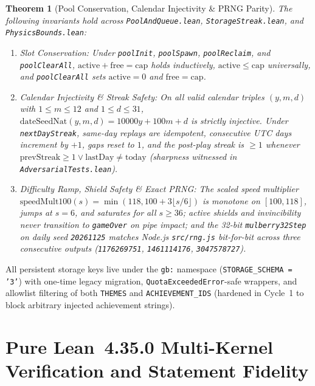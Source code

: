 \documentclass[11pt,letterpaper]{article}
\newtheorem{theorem}{Theorem}
\theoremstyle{remark}
\begin{document}
\begin{theorem}[Pool Conservation, Calendar Injectivity \& PRNG Parity]
\label{thm:pools}
The following invariants hold across \texttt{PoolAndQueue.lean}, \texttt{StorageStreak.lean}, and \texttt{PhysicsBounds.lean}:
\begin{enumerate}[leftmargin=1.8em, itemsep=1pt]
  \item \emph{Slot Conservation:} Under \texttt{poolInit}, \texttt{poolSpawn}, \texttt{poolReclaim}, and \texttt{poolClearAll}, $\mathrm{active} + \mathrm{free} = \mathrm{cap}$ holds inductively, $\mathrm{active} \le \mathrm{cap}$ universally, and \texttt{poolClearAll} sets $\mathrm{active} = 0$ and $\mathrm{free} = \mathrm{cap}$.
  \item \emph{Calendar Injectivity \& Streak Safety:} On all valid calendar triples $(y, m, d)$ with $1 \le m \le 12$ and $1 \le d \le 31$, $\mathrm{dateSeedNat}(y,m,d) = 10000y + 100m + d$ is strictly injective. Under \texttt{nextDayStreak}, same-day replays are idempotent, consecutive UTC days increment by $+1$, gaps reset to $1$, and the post-play streak is $\ge 1$ whenever $\mathrm{prevStreak} \ge 1 \vee \mathrm{lastDay} \neq \mathrm{today}$ (sharpness witnessed in \texttt{AdversarialTests.lean}).
  \item \emph{Difficulty Ramp, Shield Safety \& Exact PRNG:} The scaled speed multiplier $\mathrm{speedMult100}(s) = \min(118, 100 + 3\lfloor s/6 \rfloor)$ is monotone on $[100, 118]$, jumps at $s=6$, and saturates for all $s \ge 36$; active shields and invincibility never transition to \texttt{gameOver} on pipe impact; and the 32-bit \texttt{mulberry32Step} on daily seed \texttt{20261125} matches Node.js \texttt{src/rng.js} bit-for-bit across three consecutive outputs (\texttt{1176269751}, \texttt{1461114176}, \texttt{3047578727}).
\end{enumerate}
\end{theorem}

All persistent storage keys live under the \texttt{gb:} namespace (\texttt{STORAGE\_SCHEMA = '3'}) with one-time legacy migration, \texttt{QuotaExceededError}-safe wrappers, and allowlist filtering of both \texttt{THEMES} and \texttt{ACHIEVEMENT\_IDS} (hardened in Cycle~1 to block arbitrary injected achievement strings).

\section{Pure Lean~4.35.0 Multi-Kernel Verification and Statement Fidelity}
\label{sec:lean}
\end{document}
